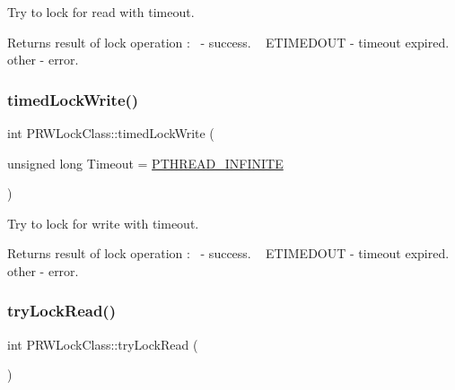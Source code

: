 Try to lock for read with timeout. \begin{DoxyReturn}{Returns}
result of lock operation \+:~ -\/ success. ~\newline
 E\+T\+I\+M\+E\+D\+O\+UT -\/ timeout expired.~\newline
 other -\/ error. 
\end{DoxyReturn}
\mbox{\label{classPRWLockClass_a4b4571cc739699bfcc7b62543c173dec}} 
\subsubsection{\texorpdfstring{timed\+Lock\+Write()}{timedLockWrite()}}
{\footnotesize\ttfamily int P\+R\+W\+Lock\+Class\+::timed\+Lock\+Write (\begin{DoxyParamCaption}\item[{unsigned long}]{Timeout = {\ttfamily \hyperlink{PThreadClassLib_8h_a9d2d74d73cb5d069fbfcbcfebf42bd6e}{P\+T\+H\+R\+E\+A\+D\+\_\+\+I\+N\+F\+I\+N\+I\+TE}} }\end{DoxyParamCaption})}

Try to lock for write with timeout. \begin{DoxyReturn}{Returns}
result of lock operation \+:~ -\/ success. ~\newline
 E\+T\+I\+M\+E\+D\+O\+UT -\/ timeout expired.~\newline
 other -\/ error. 
\end{DoxyReturn}
\mbox{\label{classPRWLockClass_a20f4dadadb861f8d3784e42ed79c5644}} 
\subsubsection{\texorpdfstring{try\+Lock\+Read()}{tryLockRead()}}
{\footnotesize\ttfamily int P\+R\+W\+Lock\+Class\+::try\+Lock\+Read (\begin{DoxyParamCaption}{ }\end{DoxyParamCaption})\hspace{0.3cm}{\ttfamily [inline]}}

